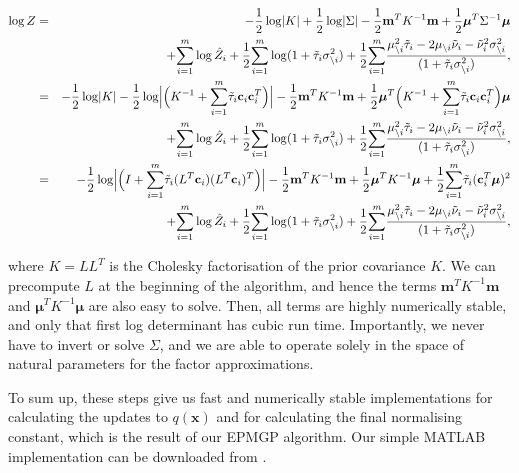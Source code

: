 \documentclass[twoside,11pt]{article}
\def\x{{\mathbf x}}
\def\c{{\mathbf c}}
\def\m{{\mathbf m}}
\def\boldmu{\bm{\mu}}
\newcommand{\wo}{\setminus}
\begin{document}
\begin{eqnarray}
\label{eqn:logZstable}
\log Z &= & 
-\frac{1}{2}\log\lvert K \rvert 
+ \frac{1}{2}\log\lvert \Sigma \rvert 
-\frac{1}{2}\m^TK^{-1}\m \nonumber 
+\frac{1}{2}\boldmu^T\Sigma^{-1}\boldmu
\\ && ~~
+ \overset{m}{\sum_{i=1}}\log
\hat{Z}_i + \frac{1}{2}\overset{m}{\sum_{i=1}}\log (1 + \tilde{\tau}_i\sigma_{\wo i}^2) 
+ \frac{1}{2}\overset{m}{\sum_{i=1}}\frac{\mu_{\wo i}^2\tilde{\tau}_i - 2\mu_{\wo i}\tilde{\nu}_i - \tilde{\nu}^{2}_i\sigma^2_{\wo i}}{(1 + \tilde{\tau}_i\sigma_{\wo i}^2) }, \nonumber \\
&= & 
-\frac{1}{2}\log\lvert K \rvert 
- \frac{1}{2}\log\Bigl\lvert     \Bigl(K^{-1} + \overset{m}{\sum_{i=1}} \tilde{\tau}_i\c_i\c_i^T\Bigr)  \Bigr\rvert 
-\frac{1}{2}\m^TK^{-1}\m \nonumber 
+\frac{1}{2}\boldmu^T\Bigl( K^{-1} + \overset{m}{\sum_{i=1}} \tilde{\tau}_i\c_i\c_i^T\Bigr ) \boldmu
\\ && ~~
+ \overset{m}{\sum_{i=1}}\log
\hat{Z}_i + \frac{1}{2}\overset{m}{\sum_{i=1}}\log (1 + \tilde{\tau}_i\sigma_{\wo i}^2) 
+ \frac{1}{2}\overset{m}{\sum_{i=1}}\frac{\mu_{\wo i}^2\tilde{\tau}_i - 2\mu_{\wo i}\tilde{\nu}_i - \tilde{\nu}^{2}_i\sigma^2_{\wo i}}{(1 + \tilde{\tau}_i\sigma_{\wo i}^2) }, \nonumber \\
&= & 
-\frac{1}{2}\log\Bigl\lvert     \Bigl(I + \overset{m}{\sum_{i=1}} \tilde{\tau}_i(L^T\c_i)(L^T\c_i)^T\Bigr)  \Bigr\rvert 
-\frac{1}{2}\m^TK^{-1}\m 
+\frac{1}{2}\boldmu^TK^{-1}\boldmu 
+\frac{1}{2}\overset{m}{\sum_{i=1}} \tilde{\tau}_i(\c_i^T\boldmu)^2 \nonumber
\\ && ~~
+ \overset{m}{\sum_{i=1}}\log
\hat{Z}_i + \frac{1}{2}\overset{m}{\sum_{i=1}}\log (1 + \tilde{\tau}_i\sigma_{\wo i}^2) 
+ \frac{1}{2}\overset{m}{\sum_{i=1}}\frac{\mu_{\wo i}^2\tilde{\tau}_i - 2\mu_{\wo i}\tilde{\nu}_i - \tilde{\nu}^{2}_i\sigma^2_{\wo i}}{(1 + \tilde{\tau}_i\sigma_{\wo i}^2) },
\end{eqnarray}

\noindent where $K = LL^T$ is the Cholesky factorisation of the prior covariance $K$.  We can precompute $L$ at the beginning of the algorithm, and hence the terms $\m^TK^{-1}\m$ and $\boldmu^TK^{-1}\boldmu$ are also easy to solve.  Then, all terms are highly numerically stable, and only that first log determinant has cubic run time.  Importantly, we never have to invert or solve $\Sigma$, and we are able to operate solely in the space of natural parameters for the factor approximations.

To sum up, these steps give us fast and numerically stable implementations for calculating the updates to $q(\x)$ and for calculating the final normalising constant, which is the result of our EPMGP algorithm.   Our simple MATLAB implementation can be downloaded from {\tt <url to come with publication>}.
\end{document}
